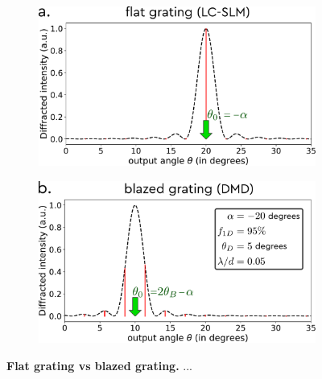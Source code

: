 \documentclass[12pt]{iopart}
\begin{document}
\begin{figure}
  \centering
  \begin{subfigure}{0.49\textwidth}
    \centering
    \includegraphics[width = \textwidth]{images/gratings_flat.pdf}
    \label{fig:flat_grating}
  \end{subfigure}
  \begin{subfigure}{0.49\textwidth}
    \centering
    \includegraphics[width = \textwidth]{images/gratings_blazed.pdf}
    \label{fig:blazed_right}
  \end{subfigure}
  \caption{
    \textbf{Flat grating vs blazed grating.}
    ...
  }
  \label{fig:gratings}
\end{figure}




\end{document}
